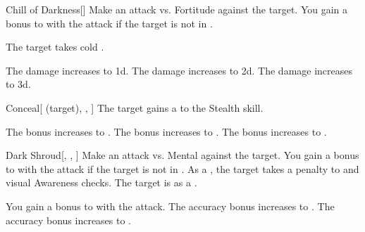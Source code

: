 \lowercase{\hypertarget{spell:Chill of Darkness}{}}\label{spell:Chill of Darkness}
\begin{freeability}[Rank 1]{\hypertarget{spell:Chill of Darkness}{Chill of Darkness}}[]
Make an attack vs. Fortitude against the target.
You gain a  bonus to  with the attack if the target is not in .

\hit The target takes cold .

\rankline
{} The damage increases to  \plus1d.
 The damage increases to  \plus2d.
 The damage increases to  \plus3d.
\end{freeability}
\vspace{0.25em}



\lowercase{\hypertarget{spell:Conceal}{}}\label{spell:Conceal}
\begin{attuneability}[Rank 1]{\hypertarget{spell:Conceal}{Conceal}}[ (target), , ]
The target gains a   to the Stealth skill.

\rankline
{} The bonus increases to .
 The bonus increases to .
 The bonus increases to .
\end{attuneability}
\vspace{0.25em}



\lowercase{\hypertarget{spell:Dark Shroud}{}}\label{spell:Dark Shroud}
\begin{freeability}[Rank 1]{\hypertarget{spell:Dark Shroud}{Dark Shroud}}[, , ]
Make an attack vs. Mental against the target.
You gain a  bonus to  with the attack if the target is not in .
\hit As a , the target takes a  penalty to  and visual Awareness checks.
\crit The target is  as a .

\rankline
{} You gain a  bonus to  with the attack.
 The accuracy bonus increases to .
 The accuracy bonus increases to .
\end{freeability}
\vspace{0.25em}



